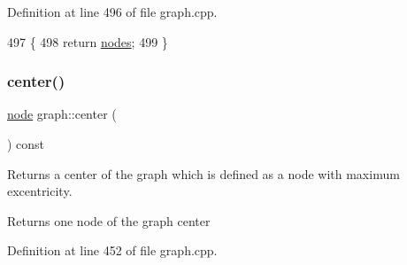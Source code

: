 Definition at line 496 of file graph.\+cpp.


\begin{DoxyCode}
497 \{
498     \textcolor{keywordflow}{return} \mbox{\hyperlink{classgraph_a4ea0592e8eb7c26c5abad24546907726}{nodes}};
499 \}
\end{DoxyCode}
\mbox{\label{classgraph_a351617e023b4b6833ab650a70fc086e7}} 
\subsubsection{\texorpdfstring{center()}{center()}}
{\footnotesize\ttfamily \mbox{\hyperlink{classnode}{node}} graph\+::center (\begin{DoxyParamCaption}{ }\end{DoxyParamCaption}) const\hspace{0.3cm}{\ttfamily [inherited]}}

Returns a center of the graph which is defined as a node with maximum excentricity.

\begin{DoxyReturn}{Returns}
one node of the graph center 
\end{DoxyReturn}


Definition at line 452 of file graph.\+cpp.


